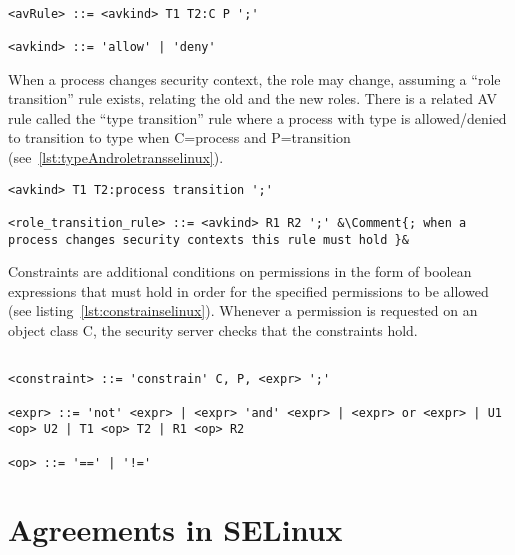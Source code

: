 \lstset{language=selinux}
\begin{lstlisting}[frame=single, caption={AV Rule},label={lst:avruleselinux}]

<avRule> ::= <avkind> T1 T2:C P ';'

<avkind> ::= 'allow' | 'deny'
\end{lstlisting}

When a process changes security context, the role may change, assuming a ``role transition'' rule exists, relating the old and the new roles. There is a related AV rule called the ``type transition'' rule where a process with type  is allowed/denied to transition to type  when C=process and P=transition (see~\ref{lst:typeAndroletransselinux}).

\lstset{mathescape, language=AST} 
\begin{minipage}[c]{0.95\textwidth}
\begin{lstlisting}[frame=single, caption={Type Transition and Role-Allow Rules},label={lst:typeAndroletransselinux}]
<avkind> T1 T2:process transition ';'

<role_transition_rule> ::= <avkind> R1 R2 ';' &\Comment{; when a process changes security contexts this rule must hold }&
\end{lstlisting}
\end{minipage}

Constraints are additional conditions on permissions in the form of boolean expressions that must hold in order for the specified permissions to be allowed (see listing~\ref{lst:constrainselinux}). Whenever a permission is requested on an object class C, the security server checks that the constraints hold.

\lstset{language=selinux}
\begin{lstlisting}[frame=single, caption={Constraint Definition},label={lst:constrainselinux}]

<constraint> ::= 'constrain' C, P, <expr> ';'

<expr> ::= 'not' <expr> | <expr> 'and' <expr> | <expr> or <expr> | U1 <op> U2 | T1 <op> T2 | R1 <op> R2

<op> ::= '==' | '!='
\end{lstlisting}

\section{Agreements in SELinux}

